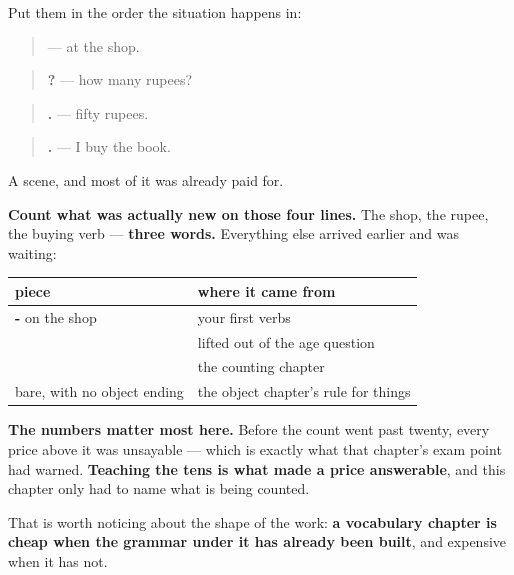 Put them in the order the situation happens in:

\begin{quote}
\textbf{} — at the shop.
\end{quote}

\begin{quote}
\textbf{ ?} — how many rupees?
\end{quote}

\begin{quote}
\textbf{ .} — fifty rupees.
\end{quote}

\begin{quote}
\textbf{  .} — I buy the book.
\end{quote}

\begin{grammarlens}[title={What you've built}]
A scene, and most of it was already paid for.

\textbf{Count what was actually new on those four lines.} The shop, the rupee, the buying verb — \textbf{three words.} Everything else arrived earlier and was waiting:

\noindent
\begin{tabularx}{\linewidth}{@{}>{\raggedright\arraybackslash}X>{\raggedright\arraybackslash}X@{}}
\toprule
\textbf{piece} & \textbf{where it came from} \\
\midrule
\textbf{-\ml{ഇൽ}} on the shop & your first verbs \\
\textbf{\ml{എത്ര}} & lifted out of the age question \\
\textbf{\ml{അമ്പത്}} & the counting chapter \\
\textbf{\ml{പുസ്തകം}} bare, with no object ending & the object chapter's rule for things \\
\bottomrule
\end{tabularx}

\textbf{The numbers matter most here.} Before the count went past twenty, every price above it was unsayable — which is exactly what that chapter's exam point had warned. \textbf{Teaching the tens is what made a price answerable}, and this chapter only had to name what is being counted.

That is worth noticing about the shape of the work: \textbf{a vocabulary chapter is cheap when the grammar under it has already been built}, and expensive when it has not.
\end{grammarlens}

